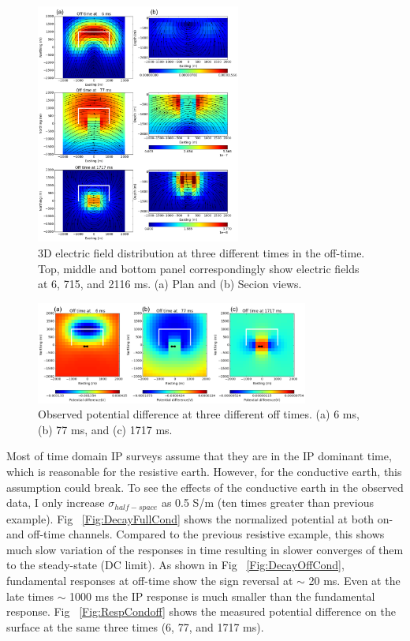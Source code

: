 \documentclass[letterpaper,11pt]{article}
\begin{document}
\begin{figure}[htb]
  \centering
  \includegraphics[width=0.6\textwidth]{figures/EvecResisoff.png}
  \caption{3D electric field distribution at three different times in the off-time. Top, middle and bottom panel correspondingly show electric fields at 6, 715, and 2116 ms. (a) Plan and (b) Secion views.}
  \label{Fig:EvecResisoff}
\end{figure}

\begin{figure}[htb]
  \centering
  \includegraphics[width=0.8\textwidth]{figures/RespResisoff.png}
  \caption{Observed potential difference at three different off times. (a) 6 ms, (b) 77 ms, and (c) 1717 ms. }
  \label{Fig:RespResisoff}
\end{figure}

Most of time domain IP surveys assume that they are in the IP dominant time, which is reasonable for the resistive earth. 
However, for the conductive earth, this assumption could break. To see the effects of the conductive earth in the observed data, I only increase $\sigma_{half-space}$ as 0.5 S/m (ten times greater than previous example). Fig ~\ref{Fig:DecayFullCond} shows the normalized potential at both on- and off-time channels. Compared to the previous resistive example, this shows much slow variation of the responses in time resulting in slower converges of them to the steady-state (DC limit). As shown in Fig ~\ref{Fig:DecayOffCond}, fundamental responses at off-time show the sign reversal at $\sim$ 20 ms. Even at the late times $\sim$ 1000 ms the IP response is much smaller than the fundamental response. Fig ~\ref{Fig:RespCondoff} shows the measured potential difference on the surface at the same three times (6, 77, and 1717 ms). 
\end{document}
